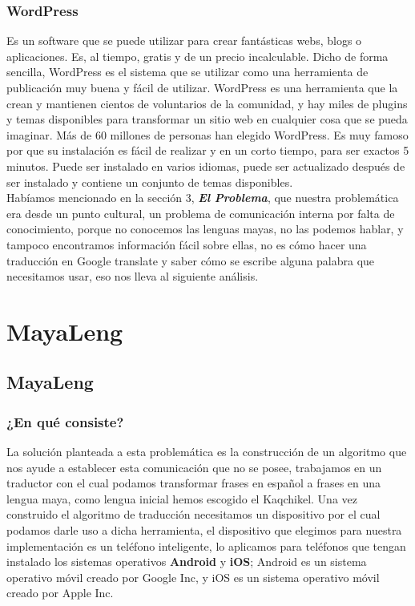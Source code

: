 \documentclass[a4paper,openright,11pt]{article}
\begin{document}
\subsubsection{WordPress}
Es un software que se puede utilizar para crear fantásticas webs, blogs o aplicaciones. Es, al tiempo, gratis y de un precio incalculable. Dicho de forma sencilla, WordPress es el sistema que se utilizar como una herramienta de publicación muy buena y fácil de utilizar. WordPress es una herramienta que la crean y mantienen cientos de voluntarios de la comunidad, y hay miles de plugins y temas disponibles para transformar un sitio web en cualquier cosa que se pueda imaginar. Más de 60 millones de personas han elegido WordPress. Es muy famoso por que su instalación es fácil de realizar y en un corto tiempo, para ser exactos 5 minutos. Puede ser instalado en varios idiomas, puede ser actualizado después de ser instalado y contiene un conjunto de temas disponibles.\\

Habíamos mencionado en la sección 3, \textbf{\textit{El Problema}}, que nuestra problemática era desde un punto cultural, un problema de comunicación interna por falta de conocimiento, porque no conocemos las lenguas mayas, no las podemos hablar, y tampoco encontramos información fácil sobre ellas, no es cómo hacer una traducción en Google translate y saber cómo se escribe alguna palabra que necesitamos usar, eso nos lleva al siguiente análisis. \\
\newpage

\section{MayaLeng}
\subsection{MayaLeng}
\subsubsection{¿En qué consiste?}
La solución planteada a esta problemática es la construcción de un algoritmo que nos ayude a establecer esta comunicación que no se posee, trabajamos en un traductor con el cual podamos transformar frases en español a frases en una lengua maya, como lengua inicial hemos escogido el Kaqchikel. Una vez construido el algoritmo de traducción necesitamos un dispositivo por el cual podamos darle uso a dicha herramienta, el dispositivo que elegimos para nuestra implementación es un teléfono inteligente, lo aplicamos para teléfonos que tengan instalado los sistemas operativos \textbf{Android} y \textbf{iOS}; Android es un sistema operativo móvil creado por Google Inc, y iOS es un sistema operativo móvil creado por Apple Inc.
\end{document}
